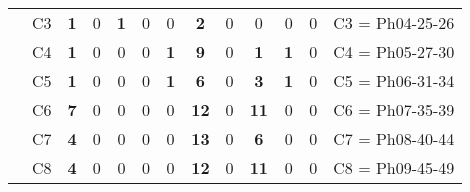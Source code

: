 \begin{table}[H]
{\begin{tabular}{|ccrrrrrrrrrrc|}
\multicolumn{1}{|c|}{}                                      & \multicolumn{1}{c|}{C3} & \multicolumn{1}{c|}{\textbf{1}}  & \multicolumn{1}{c|}{0}  & \multicolumn{1}{c|}{\textbf{1}}  & \multicolumn{1}{c|}{0}  & \multicolumn{1}{c|}{0}  & \multicolumn{1}{c|}{\textbf{2}}  & \multicolumn{1}{c|}{0}  & \multicolumn{1}{c|}{0}  & \multicolumn{1}{c|}{0}  & \multicolumn{1}{c|}{0}  & C3 = Ph04-25-26   \\ \cline{2-13}
\multicolumn{1}{|c|}{}                                      & \multicolumn{1}{c|}{C4} & \multicolumn{1}{c|}{\textbf{1}}  & \multicolumn{1}{c|}{0}  & \multicolumn{1}{c|}{0}  & \multicolumn{1}{c|}{0}  & \multicolumn{1}{c|}{\textbf{1}}  & \multicolumn{1}{c|}{\textbf{9}}  & \multicolumn{1}{c|}{0}  & \multicolumn{1}{c|}{\textbf{1}}  & \multicolumn{1}{c|}{\textbf{1}}  & \multicolumn{1}{c|}{0}  & C4 = Ph05-27-30   \\ \cline{2-13}
\multicolumn{1}{|c|}{}                                      & \multicolumn{1}{c|}{C5} & \multicolumn{1}{c|}{\textbf{1}}  & \multicolumn{1}{c|}{0}  & \multicolumn{1}{c|}{0}  & \multicolumn{1}{c|}{0}  & \multicolumn{1}{c|}{\textbf{1}}  & \multicolumn{1}{c|}{\textbf{6}}  & \multicolumn{1}{c|}{0}  & \multicolumn{1}{c|}{\textbf{3}}  & \multicolumn{1}{c|}{\textbf{1}}  & \multicolumn{1}{c|}{0}  & C5 = Ph06-31-34   \\ \cline{2-13}
\multicolumn{1}{|c|}{}                                      & \multicolumn{1}{c|}{C6} & \multicolumn{1}{c|}{\textbf{7}}  & \multicolumn{1}{c|}{0}  & \multicolumn{1}{c|}{0}  & \multicolumn{1}{c|}{0}  & \multicolumn{1}{c|}{0}  & \multicolumn{1}{c|}{\textbf{12}} & \multicolumn{1}{c|}{0}  & \multicolumn{1}{c|}{\textbf{11}} & \multicolumn{1}{c|}{0}  & \multicolumn{1}{c|}{0}  & C6 = Ph07-35-39   \\ \cline{2-13}
\multicolumn{1}{|c|}{}                                      & \multicolumn{1}{c|}{C7} & \multicolumn{1}{c|}{\textbf{4}}  & \multicolumn{1}{c|}{0}  & \multicolumn{1}{c|}{0}  & \multicolumn{1}{c|}{0}  & \multicolumn{1}{c|}{0}  & \multicolumn{1}{c|}{\textbf{13}} & \multicolumn{1}{c|}{0}  & \multicolumn{1}{c|}{\textbf{6}}  & \multicolumn{1}{c|}{0}  & \multicolumn{1}{c|}{0}  & C7 = Ph08-40-44   \\ \cline{2-13}
\multicolumn{1}{|c|}{}                                      & \multicolumn{1}{c|}{C8} & \multicolumn{1}{c|}{\textbf{4}}  & \multicolumn{1}{c|}{0}  & \multicolumn{1}{c|}{0}  & \multicolumn{1}{c|}{0}  & \multicolumn{1}{c|}{0}  & \multicolumn{1}{c|}{\textbf{12}} & \multicolumn{1}{c|}{0}  & \multicolumn{1}{c|}{\textbf{11}} & \multicolumn{1}{c|}{0}  & \multicolumn{1}{c|}{0}  & C8 = Ph09-45-49   \\ \cline{2-13}

\end{tabular}}
\end{table}
